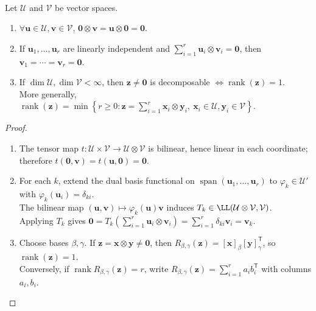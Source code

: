 \begin{theorem} \label{thm:tensor-zero-test-and-decomposable-rank} \\
Let $\mathcal{U}$ and $\mathcal{V}$ be vector spaces.
\begin{enumerate}[label=(\roman*)]
\setlength{\itemsep}{0pt}
\item $\forall \mathbf{u}\in\mathcal{U},\mathbf{v}\in\mathcal{V}$, $\mathbf{0}\otimes\mathbf{v}=\mathbf{u}\otimes\mathbf{0}=\mathbf{0}$.
\item If $\mathbf{u}_1,\ldots,\mathbf{u}_r$ are linearly independent and $\sum\limits_{i=1}^{r}\mathbf{u}_i\otimes\mathbf{v}_i=\mathbf{0}$, then $\mathbf{v}_1=\cdots=\mathbf{v}_r=\mathbf{0}$.
\item If $\dim\mathcal{U},\dim\mathcal{V}<\infty$, then $\mathbf{z}\neq\mathbf{0}$ is decomposable $\Longleftrightarrow \operatorname{rank}(\mathbf{z})=1$.\\
More generally, $\operatorname{rank}(\mathbf{z})=\min\left\{r\ge0:\mathbf{z}=\sum\limits_{i=1}^{r}\mathbf{x}_i\otimes\mathbf{y}_i,\ \mathbf{x}_i\in\mathcal{U},\mathbf{y}_i\in\mathcal{V}\right\}$.
\end{enumerate}
\begin{proof}
\begin{enumerate}[label=(\roman*)]
\setlength{\itemsep}{0pt}
\item The tensor map $t:\mathcal{U}\times\mathcal{V}\to\mathcal{U}\otimes\mathcal{V}$ is bilinear, hence linear in each coordinate; therefore $t(\mathbf{0},\mathbf{v})=t(\mathbf{u},\mathbf{0})=\mathbf{0}$.
\item For each $k$, extend the dual basis functional on $\operatorname{span}(\mathbf{u}_1,\ldots,\mathbf{u}_r)$ to $\varphi_k\in\mathcal{U}'$ with $\varphi_k(\mathbf{u}_i)=\delta_{ki}$.\\
The bilinear map $(\mathbf{u},\mathbf{v})\mapsto\varphi_k(\mathbf{u})\mathbf{v}$ induces $T_k\in\LL(\mathcal{U}\otimes\mathcal{V},\mathcal{V})$.\\
Applying $T_k$ gives $\mathbf{0}=T_k\left(\sum_{i=1}^{r}\mathbf{u}_i\otimes\mathbf{v}_i\right)=\sum\limits_{i=1}^{r}\delta_{ki}\mathbf{v}_i=\mathbf{v}_k$.
\item Choose bases $\beta,\gamma$. If $\mathbf{z}=\mathbf{x}\otimes\mathbf{y}\neq\mathbf{0}$, then $R_{\beta,\gamma}(\mathbf{z})=[\mathbf{x}]_\beta[\mathbf{y}]_\gamma^{\mathsf{T}}$, so $\operatorname{rank}(\mathbf{z})=1$.\\
Conversely, if $\operatorname{rank}R_{\beta,\gamma}(\mathbf{z})=r$, write $R_{\beta,\gamma}(\mathbf{z})=\sum\limits_{i=1}^{r}a_i b_i^{\mathsf{T}}$ with columns $a_i,b_i$.\\

\end{enumerate}
\end{proof}
\end{theorem}
